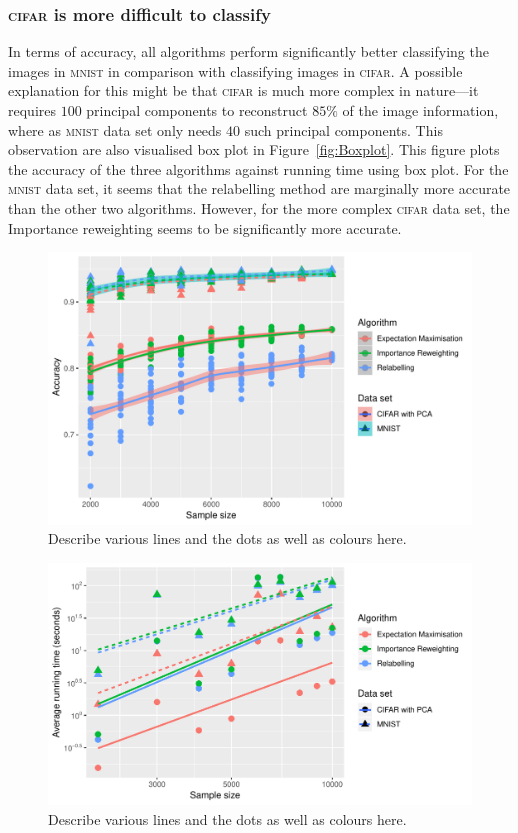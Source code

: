 \documentclass[12pt]{article} %
\begin{document}
\subsubsection{\textsc{cifar} is more difficult to classify}
In terms of accuracy, all algorithms perform significantly better classifying the images in \textsc{mnist} in comparison with classifying images in \textsc{cifar}.
A possible explanation for this might be that \textsc{cifar} is much more complex in nature---it requires $100$ principal components to reconstruct $85\%$ of the image information, where as \textsc{mnist} data set only needs $40$ such principal components.
This observation are also visualised box plot in Figure~\ref{fig:Boxplot}. This figure plots the accuracy of the three algorithms against running time using box plot. For the \textsc{mnist}  data set, it seems that the relabelling method are marginally more accurate than the other two algorithms. However, for the  more complex \textsc{cifar} data set, the Importance reweighting seems to be significantly more accurate.
\begin{figure}
	\centering
    \includegraphics[scale=1]{accuracy}%
	\caption{ {\color{red}Describe various lines and the dots as well as colours here. }
}
	\label{fig:acc}
\end{figure}
\begin{figure}
	\centering
    \includegraphics[scale=1]{speed}%
	\caption{ {\color{red}Describe various lines and the dots as well as colours here. }
}
	\label{fig:speed}
\end{figure}
\end{document}
